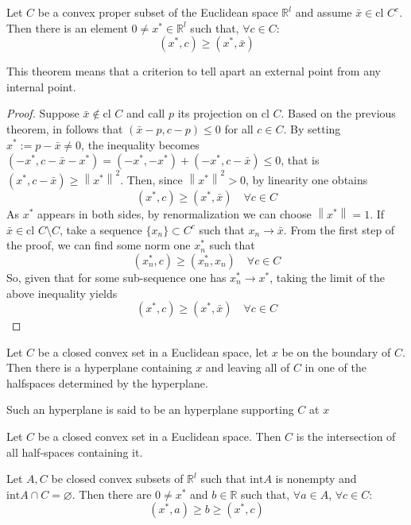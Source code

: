 \begin{theorem}
    Let $C$ be a convex proper subset of the Euclidean space $\mathbb{R}^l$ and assume $\bar{x} \in \text{cl } C^c$.
    Then there is an element $0\neq x^\ast \in \mathbb{R}^l$ such that, $\forall c \in C$:
    \[(x^\ast, c) \geq (x^\ast, \bar{x})\]
\end{theorem}
This theorem means that a criterion to tell apart an external point from any internal point. 
\begin{proof}
    Suppose $\bar{x} \notin \text{cl } C$ and call $p$ its projection on $\text{cl } C$. 
    Based on the previous theorem, in follows that $(\bar{x} - p, c - p) \leq 0$ for all $c \in C$. 
    By setting $x^\ast := p - \bar{x} \neq 0$, the inequality becomes $(-x^\ast, c - \bar{x} - x^\ast) =(-x^\ast, -x^\ast) + (-x^\ast, c - \bar{x}) \leq 0$, that is $(x^\ast, c - \bar{x}) \geq \left\lVert x^\ast\right\rVert^2$. 
    Then, since $\left\lVert x^\ast\right\rVert^2> 0$, by linearity one obtains
    \[(x^\ast, c) \geq (x^\ast, \bar{x}) \quad \forall c \in C\]
    As $x^\ast$ appears in both sides, by renormalization we can choose $\left\lVert x^\ast\right\rVert  = 1$. 
    If $\bar{x} \in \text{cl }C \setminus C$, take a sequence $\{x_n\} \subset C^c$ such that $x_n \rightarrow \bar{x}$. 
    From the first step of the proof, we can find some norm one $x^\ast_n$ such that
    \[(x^\ast_n, c) \geq (x^\ast_n, x_n) \quad \forall c \in C\]
    So, given that for some sub-sequence one has $x^\ast_n \rightarrow x^\ast$, taking the limit of the above inequality yields
    \[(x^\ast, c) \geq (x^\ast, \bar{x}) \quad \forall c \in C\]
\end{proof}
\begin{corollary}
    Let $C$ be a closed convex set in a Euclidean space, let $x$ be on the boundary of $C$.
    Then there is a hyperplane containing $x$ and leaving all of $C$ in one of the halfspaces determined by the hyperplane.
\end{corollary}
Such an hyperplane is said to be an hyperplane supporting $C$ at $x$
\begin{corollary}
    Let $C$ be a closed convex set in a Euclidean space. 
    Then $C$ is the intersection of all half-spaces containing it.
\end{corollary}
\begin{theorem}
    Let $A, C$ be closed convex subsets of $\mathbb{R}^l$ such that $\text{int} A$ is nonempty and $\text{int}A \cap C = \varnothing$. 
    Then there are $0 \neq x^\ast$ and $b \in \mathbb{R}$ such that, $\forall a \in A$, $\forall c \in C$:
    \[(x^\ast, a) \geq b \geq (x^\ast, c)\]
\end{theorem}
